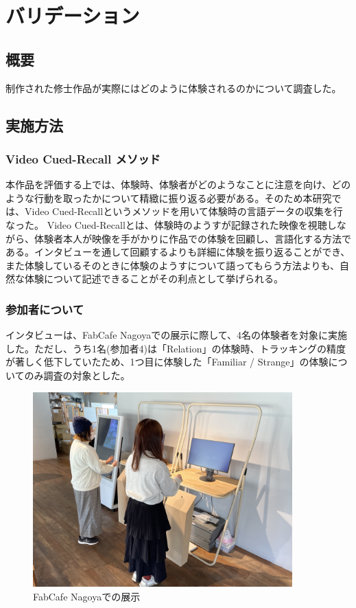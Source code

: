 \chapter{バリデーション}
\label{validation}
\section{概要}
制作された修士作品が実際にはどのように体験されるのかについて調査した。

\section{実施方法}
\subsection{Video Cued-Recall メソッド}
本作品を評価する上では、体験時、体験者がどのようなことに注意を向け、どのような行動を取ったかについて精緻に振り返る必要がある。そのため本研究では、Video Cued-Recallというメソッドを用いて体験時の言語データの収集を行なった。 Video Cued-Recallとは、体験時のようすが記録された映像を視聴しながら、体験者本人が映像を手がかりに作品での体験を回顧し、言語化する方法である\cite{Costello2005}。インタビューを通して回顧するよりも詳細に体験を振り返ることができ、また体験しているそのときに体験のようすについて語ってもらう方法よりも、自然な体験について記述できることがその利点として挙げられる。

\subsection{参加者について}
インタビューは、FabCafe Nagoyaでの展示に際して、4名の体験者を対象に実施した。ただし、うち1名(参加者4)は「Relation」の体験時、トラッキングの精度が著しく低下していたため、1つ目に体験した「Familiar / Strange」の体験についてのみ調査の対象とした。

\begin{figure}[H]
  \centering
  \includegraphics[width=10cm]{img/exhibit_at_fabcafe.jpeg}
  \caption{FabCafe Nagoyaでの展示}
  \label{fig:exhibit_at_fabcafe}
\end{figure}

